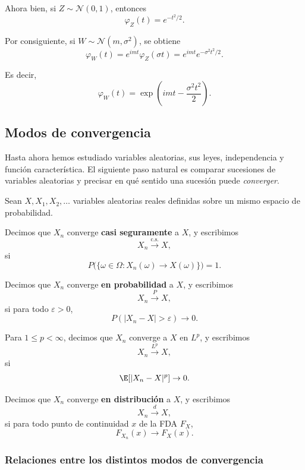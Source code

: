 \noindent
Ahora bien, si $Z\sim \mathcal{N}(0,1)$, entonces
\[
\varphi_Z(t)=e^{-t^2/2}.
\]

Por consiguiente, si $W\sim \mathcal{N}(m,\sigma^2)$, se obtiene
\[
\varphi_W(t)=e^{imt}\varphi_Z(\sigma t)
=
e^{imt}e^{-\sigma^2 t^2/2}.
\]

Es decir,
\[
\varphi_W(t)=\exp\left(imt-\frac{\sigma^2 t^2}{2}\right).
\]

\subsection{Modos de convergencia}

Hasta ahora hemos estudiado variables aleatorias, sus leyes, independencia y función característica. El siguiente paso natural es comparar sucesiones de variables aleatorias y precisar en qué sentido una sucesión puede \emph{converger}.

Sean $X,X_1,X_2,\dots$ variables aleatorias reales definidas sobre un mismo espacio de probabilidad.

\begin{defi}
Decimos que $X_n$ converge \textbf{casi seguramente} a $X$, y escribimos
\[
X_n \xrightarrow{\text{c.s.}} X,
\]
si
\[
P\big(\{\omega\in\Omega : X_n(\omega)\to X(\omega)\}\big)=1.
\]
\end{defi}

\begin{defi}
Decimos que $X_n$ converge \textbf{en probabilidad} a $X$, y escribimos
\[
X_n \xrightarrow{P} X,
\]
si para todo $\varepsilon>0$,
\[
P(|X_n-X|>\varepsilon)\to 0.
\]
\end{defi}

\begin{defi}
Para $1\le p<\infty$, decimos que $X_n$ converge a $X$ en $L^p$, y escribimos
\[
X_n \xrightarrow{L^p} X,
\]
si
\[
\E[|X_n-X|^p]\to 0.
\]
\end{defi}

\begin{defi}
Decimos que $X_n$ converge \textbf{en distribución} a $X$, y escribimos
\[
X_n \xrightarrow{d} X,
\]
si para todo punto de continuidad $x$ de la FDA $F_X$,
\[
F_{X_n}(x)\to F_X(x).
\]
\end{defi}

\subsubsection*{Relaciones entre los distintos modos de convergencia}

